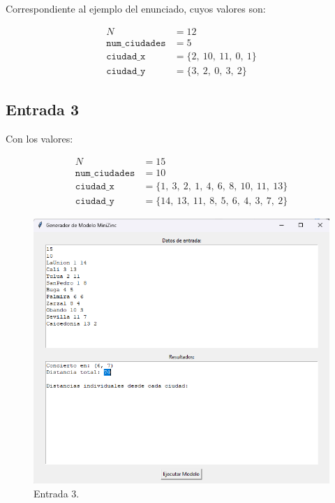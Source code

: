 \documentclass[conference]{IEEEtran}
\begin{document}
Correspondiente al ejemplo del enunciado, cuyos valores son:

\begin{align*}
	N &= 12 \\
	\texttt{num\_ciudades} &= 5 \\
	\texttt{ciudad\_x} &= \{2,\ 10,\ 11,\ 0,\ 1\} \\
	\texttt{ciudad\_y} &= \{3,\ 2,\ 0,\ 3,\ 2\}
\end{align*}

\subsection{Entrada 3}

Con los valores:

\begin{align*}
	N &= 15 \\
	\texttt{num\_ciudades} &= 10 \\
	\texttt{ciudad\_x} &= \{1,\ 3,\ 2,\ 1,\ 4,\ 6,\ 8,\ 10,\ 11,\ 13\} \\
	\texttt{ciudad\_y} &= \{14,\ 13,\ 11,\ 8,\ 5,\ 6,\ 4,\ 3,\ 7,\ 2\}
\end{align*}

\begin{figure}[h]
	\centering
	\includegraphics[width=1.0\linewidth]{images/entrada3}
	\caption{Entrada 3.}
	\label{fig:entrada3}
\end{figure}
\end{document}
